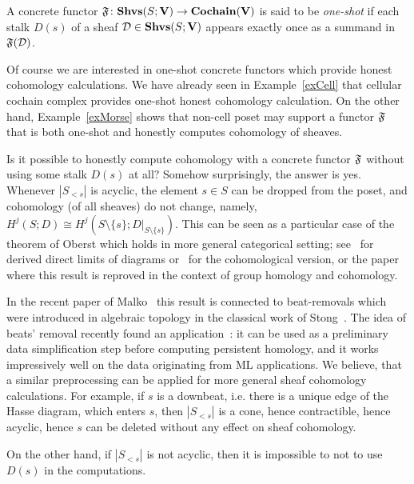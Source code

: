 \begin{defin}\label{definOneShotComplex}
A concrete functor $\mathfrak{F}\colon \mathbf{Shvs}(S;\mathbf{V})\to\mathbf{Cochain}(\mathbf{V})$ is said to be \emph{one-shot} if each stalk $D(s)$ of a sheaf $\mathcal{D}\in\mathbf{Shvs}(S;\mathbf{V})$ appears exactly once as a summand in $\mathfrak{F}(\mathcal{D})$.
\end{defin}

Of course we are interested in one-shot concrete functors which provide honest cohomology calculations. We have already seen in Example~\ref{exCell} that cellular cochain complex provides one-shot honest cohomology calculation. On the other hand, Example~\ref{exMorse} shows that non-cell poset may support a functor $\mathfrak{F}$ that is both one-shot and honestly computes cohomology of sheaves.

\begin{rem}\label{remDeletePoint}
Is it possible to honestly compute cohomology with a concrete functor $\mathfrak{F}$ without using some stalk $D(s)$ at all? Somehow surprisingly, the answer is yes. Whenever $|S_{<s}|$ is acyclic, the element $s\in S$ can be dropped from the poset, and cohomology (of all sheaves) do not change, namely, $H^j(S;D)\cong H^j(S\setminus\{s\};D|_{S\setminus\{s\}})$. This can be seen as a particular case of the theorem of Oberst which holds in more general categorical setting; see~\cite{Oberst} for derived direct limits of diagrams or~\cite[Thm.3.10]{Husainov} for the cohomological version, or the paper~\cite[Prop.3.5]{SepaFR} where this result is reproved in the context of group homology and cohomology.

In the recent paper of Malko~\cite{Malko} this result is connected to beat-removals which were introduced in algebraic topology in the classical work of Stong~\cite{Stong1966FiniteTS}. The idea of beats' removal recently found an application~\cite{BoissonnatEtAl}: it can be used as a preliminary data simplification step before computing persistent homology, and it works impressively well on the data originating from ML applications. We believe, that a similar preprocessing can be applied for more general sheaf cohomology calculations. For example, if $s$ is a downbeat, i.e. there is a unique edge of the Hasse diagram, which enters $s$, then $|S_{<s}|$ is a cone, hence contractible, hence acyclic, hence $s$ can be deleted without any effect on sheaf cohomology.
\end{rem}

On the other hand, if $|S_{<s}|$ is not acyclic, then it is impossible to not to use $D(s)$ in the computations.

